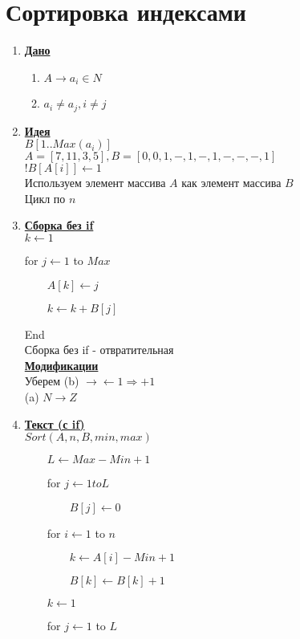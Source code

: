 \documentclass[12pt]{report}
\begin{document}
	\section*{Сортировка индексами}
	\begin{enumerate}
		\item \textbf{\underline{Дано}}
		\begin{enumerate}
			\item $A \rightarrow a_i \in N$
			\item $a_i \neq a_j, i \neq j$
		\end{enumerate}
		\item \textbf{\underline{Идея}}\\
		$B[1..Max(a_i)]$\\
		$A=[7,11,3,5], B=[0,0,1,-,1,-,1,-,-,-,1]$\\
		$!B[A[i]]\leftarrow 1$\\
		Используем элемент массива $A$ как элемент массива $B$\\
		Цикл по $n$
		\item \textbf{\underline{Сборка без if}}\\
		$k \leftarrow 1$\par
		for $j \leftarrow 1$ to $Max$\par
		$\qquad A[k] \leftarrow j$\par
		$\qquad k \leftarrow k + B[j]$\par
		End\\
		Сборка без if - отвратительная\\
		\textbf{\underline{Модификации}}\\
		Уберем (b) $\rightarrow \leftarrow 1 \Rightarrow +1$\\
		(a) $N \rightarrow Z$
		\item \textbf{\underline{Текст (с if)}}\\
		$Sort(A, n, B, min, max)$\par
		$\qquad L \leftarrow Max-Min+1$\par
		$\qquad$for $j \leftarrow 1 to L$\par
		$\qquad\qquad B[j] \leftarrow 0$\par
		$\qquad$for $i \leftarrow 1$ to $n$\par
		$\qquad\qquad k \leftarrow A[i] - Min + 1$\par
		$\qquad\qquad B[k] \leftarrow B[k] + 1$\par
		$\qquad k \leftarrow 1$\par
		$\qquad$for $j \leftarrow 1$ to $L$\par

\end{enumerate}
\end{document}
